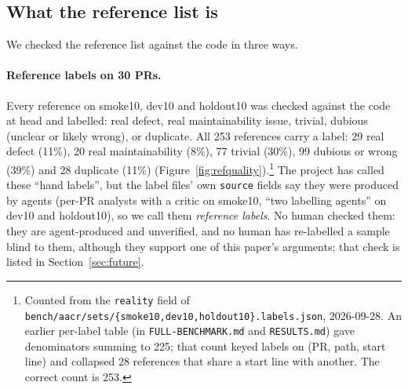 \documentclass[11pt,a4paper]{article}
\newcommand{\code}[1]{\texttt{#1}}
\begin{document}
\subsection{What the reference list is}
\label{sec:reflimits}

We checked the reference list against the code in three ways.

\paragraph{Reference labels on 30 PRs.} Every reference on smoke10, dev10
and holdout10 was checked against the code at head and labelled: real
defect, real maintainability issue, trivial, dubious (unclear or likely
wrong), or duplicate. All 253 references carry a label: 29 real defect
(11\%), 20 real maintainability (8\%), 77 trivial (30\%), 99 dubious or wrong
(39\%) and 28 duplicate (11\%) (Figure~\ref{fig:refquality}).\footnote{Counted
from the \code{reality} field of
\code{bench/aacr/sets/\{smoke10,dev10,holdout10\}.labels.json}, 2026-09-28.
An earlier per-label table (in \code{FULL-BENCHMARK.md} and
\code{RESULTS.md}) gave denominators summing to 225; that count keyed labels
on (PR, path, start line) and collapsed 28 references that share a start
line with another. The correct count is 253.}
The project has called these ``hand labels'', but the label files' own
\code{source} fields say they were produced by agents (per-PR analysts with
a critic on smoke10, ``two labelling agents'' on dev10 and holdout10), so we
call them \emph{reference labels}. No human checked them: they are
agent-produced and unverified, and no human has re-labelled a sample blind
to them, although they support one of this paper's arguments; that check is
listed in Section~\ref{sec:future}.
\end{document}
